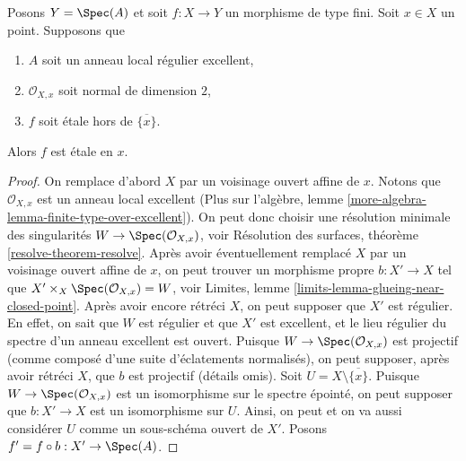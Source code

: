 \begin{lemma}
\label{lemma-key-purity-ramification}
Posons $Y = \Spec(A)$ et soit $f : X \to Y$ un morphisme de type fini.
Soit $x \in X$ un point. Supposons que
\begin{enumerate}
\item $A$ soit un anneau local régulier excellent,
\item $\mathcal{O}_{X, x}$ soit normal de dimension $2$,
\item $f$ soit \'etale hors de $\overline{\{x\}}$.
\end{enumerate}
Alors $f$ est \'etale en $x$.
\end{lemma}

\begin{proof}
On remplace d'abord $X$ par un voisinage ouvert affine de $x$.
Notons que $\mathcal{O}_{X, x}$ est un anneau local excellent
(Plus sur l'algèbre, lemme \ref{more-algebra-lemma-finite-type-over-excellent}).
On peut donc choisir une résolution minimale des singularités
$W \to \Spec(\mathcal{O}_{X, x})$, voir
Résolution des surfaces, théorème \ref{resolve-theorem-resolve}.
Après avoir éventuellement remplacé $X$ par un voisinage ouvert affine de $x$,
on peut trouver un morphisme propre $b : X' \to X$ tel que
$X' \times_X \Spec(\mathcal{O}_{X, x}) = W$, voir
Limites, lemme \ref{limits-lemma-glueing-near-closed-point}.
Après avoir encore rétréci $X$, on peut supposer que $X'$ est régulier.
En effet, on sait que $W$ est régulier et que $X'$ est excellent,
et le lieu régulier du spectre d'un anneau excellent est ouvert.
Puisque $W \to \Spec(\mathcal{O}_{X, x})$ est projectif
(comme composé d'une suite d'éclatements normalisés), on peut supposer,
après avoir rétréci $X$, que $b$ est projectif (détails omis).
Soit $U = X \setminus \overline{\{x\}}$.
Puisque $W \to \Spec(\mathcal{O}_{X, x})$ est un isomorphisme sur le
spectre épointé, on peut supposer que $b : X' \to X$ est un isomorphisme sur $U$.
Ainsi, on peut et on va aussi considérer $U$ comme un sous-schéma ouvert de $X'$.
Posons $f' = f \circ b : X' \to \Spec(A)$.


\end{proof}
